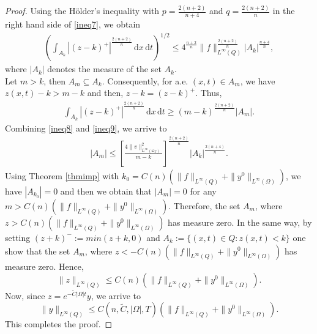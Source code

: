 \documentclass[reqno,twoside]{amsart}
\numberwithin{equation}{section}
\theoremstyle{definition}
\numberwithin{equation}{section}
\def \dis {\displaystyle}
\def \dq {\mathrm{d}x \, \mathrm{d}t}
\begin{document}
\begin{proof}
	Using the H\"{o}lder's inequality with $p=\frac{2(n+2)}{n+4}$ and $q=\frac{2(n+2)}{n}$ in the right hand side of \eqref{ineq7}, we obtain
	\begin{equation}\label{ineq8}
		\begin{array}{lll}
			\dis\left(\int_{A_k} |(z-k)^+|^{\frac{2(n+2)}{n}}\,\dq\right)^{1/2}
			\leq  4^{\frac{n+2}{n}}\|f\|^{\frac{2(n+2)}{n}}_{L^\infty(Q)}|A_k|^{\frac{n+4}{n}},
		\end{array}
	\end{equation}
	where $|A_k|$ denotes the measure of the set $A_k$.\\
	Let $m>k$, then $A_m\subseteq A_k$. Consequently,  for a.e. $(x,t)\in A_m$, we have  $z(x,t)-k>m-k$ and then,  $z-k=(z-k)^+$. Thus,
	\begin{equation}\label{ineq9}
		\begin{array}{lll}
			\dis\int_{A_k} |(z-k)^+|^{\frac{2(n+2)}{n}}\,\dq\geq (m-k)^{\frac{2(n+2)}{n}}|A_m|.
		\end{array}
	\end{equation}
	Combining \eqref{ineq8} and \eqref{ineq9}, we arrive to
	\begin{equation}\label{ineq10}
		\begin{array}{lll}
			\dis |A_m|\leq \left[\frac{4\|v\|^2_{L^\infty(\omega_T)}}{m-k}\right]^{\frac{2(n+2)}{n}}|A_k|^{\frac{2(n+4)}{n}}.
		\end{array}
	\end{equation}
	Using  Theorem \ref{thmimp} with $k_0=C(n)\left(\|f\|_{L^\infty(Q)}+\|y^0\|_{L^\infty(\Omega)}\right)$, we have $|A_{k_0}|=0$ and then we obtain that $|A_m|=0$ for any $m>C(n)\left(\|f\|_{L^\infty(Q)}+\|y^0\|_{L^\infty(\Omega)}\right)$. Therefore, the set $A_m$, where $z>C(n)\left(\|f\|_{L^\infty(Q)}+\|y^0\|_{L^\infty(\Omega)}\right)$ has measure zero. In the same way, by setting $(z+k)^-:=min(z+k,0)$ and  $A_k:=\{(x,t)\in Q:z(x,t)<k\}$ one show that the set $A_m$, where $z<-C(n)\left(\|f\|_{L^\infty(Q)}+\|y^0\|_{L^\infty(\Omega)}\right)$ has measure zero. Hence,
	\begin{equation*}
		\|z\|_{L^\infty(Q)}\leq C(n)\left(\|f\|_{L^\infty(Q)}+\|y^0\|_{L^\infty(\Omega)}\right).
	\end{equation*}
	Now, since $z=e^{-\tilde{C}|\Omega|t}y$, we arrive to
	\begin{equation*}
		\|y\|_{L^\infty(Q)}\leq C(n,\tilde{C}, |\Omega|, T)\left(\|f\|_{L^\infty(Q)}+\|y^0\|_{L^\infty(\Omega)}\right).
	\end{equation*}
	This completes the proof.	
\end{proof}
\end{document}
